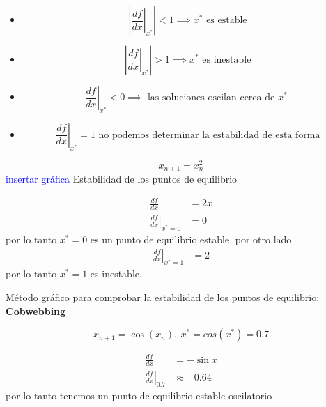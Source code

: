 \begin{itemize}
	\item \begin{equation*}
  \left| \left. \frac{df}{dx} \right|_{x^*}  \right| < 1 \implies x^* \text{ es estable } 
\end{equation*} 
\item \begin{equation*}
  \left| \left. \frac{df}{dx} \right|_{x^*}  \right|  >1 \implies x^* \text{ es inestable }
\end{equation*}
\item \begin{equation*}
			  \left. \frac{df}{dx} \right|_{x^*}<0 \implies \text{ las soluciones oscilan cerca de $x^*$ }  
			\end{equation*} 
\item \begin{equation*}
			   \left. \frac{df}{dx} \right|_{x^*}  = 1 \text{ no podemos determinar la estabilidad de esta forma } 
			\end{equation*}
\end{itemize}

\begin{ejemplo}
	\begin{equation*}
	  x_{n+1}=x_n^2 
	\end{equation*}
	\textcolor{blue}{insertar gráfica}
	Estabilidad de los puntos de equilibrio

	\begin{align*}
	  \frac{df}{dx} &= 2x \\
		\left. \frac{df}{dx} \right|_{x^*=0} &= 0
	\end{align*}
	por lo tanto $x^*=0$ es un punto de equilibrio estable, por otro lado
	\begin{align*}
		\left. 	  \frac{df}{dx}  \right|_{x^*=1} &= 2 
	\end{align*}
	por lo tanto $x^*=1$ es inestable.

	Método gráfico para comprobar la estabilidad de los puntos de equilibrio: \textbf{Cobwebbing}

	
\end{ejemplo}

\begin{ejemplo}
	\begin{equation*}
	  x_{n+1}=\cos(x_n),\ x^*=cos(x^*)=0.7 
	\end{equation*}

	\begin{equation*}
	  \begin{split}
	  	\frac{df}{dx} &= -\sin x \\
			\left. \frac{df}{dx} \right|_{0.7} &\approx -0.64  
	  \end{split} 
	\end{equation*}
	por lo tanto tenemos un punto de equilibrio estable oscilatorio 

\end{ejemplo}


